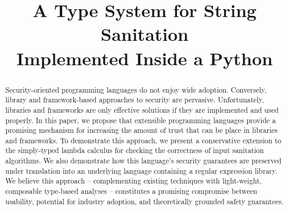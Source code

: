 \documentclass{acm_proc_article-sp}
\theoremstyle{definition}
\begin{document}


\newcommand{\Ace}{\textsf{Ace}}

\title{A Type System for String Sanitation\\Implemented Inside a Python}


\maketitle
\begin{abstract}
Security-oriented programming languages do not enjoy wide adoption. Conversely, library and framework-based approaches to security are pervasive. Unfortunately, libraries and frameworks are only effective solutions if they are implemented and used properly. In this paper, we propose that extensible programming languages provide a promising mechanism for increasing the amount of trust that can be place in libraries and frameworks. To demonstrate this approach, we present a conservative extension to the simply-typed lambda calculus for checking the correctness of input sanitation algorithms. We also demonstrate how this language's security guarantees are preserved under translation into an underlying language containing a regular expression library. We believe this approach -- complementing existing techniques with light-weight, composable type-based analyses -- constitutes a promising compromise between usability, potential for industry adoption, and theoretically grounded safety guarantees.
\end{abstract}

\end{document}
